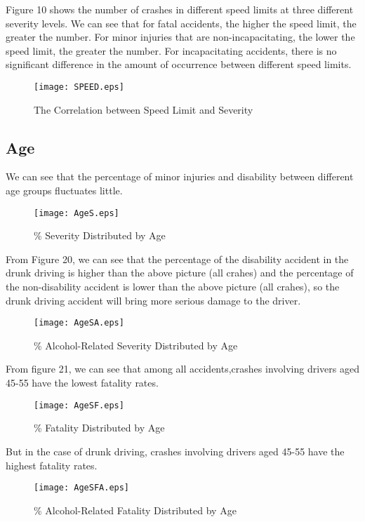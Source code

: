 \documentclass[10pt]{article}
\begin{document}
Figure 10 shows the number of crashes in different speed limits at three different severity levels. We can see that for fatal accidents, the higher the speed limit, the greater the number. For minor injuries that are non-incapacitating, the lower the speed limit, the greater the number. For incapacitating accidents, there is no significant difference in the amount of occurrence between different speed limits.

\begin{figure}[H]
\flushleft
\texttt{[image: SPEED.eps]}
\caption{The Correlation between Speed Limit and Severity}
\label{18}
\end{figure}

\newpage
\subsection{Age}

We can see that the percentage of minor injuries and disability between different age groups fluctuates little.

\begin{figure}[H]
\flushleft
\texttt{[image: AgeS.eps]}
\caption{\% Severity Distributed by Age}
\label{19}
\end{figure}

\newpage

From Figure 20, we can see that the percentage of the disability accident in the drunk driving is higher than the above picture (all crahes) and the percentage of the non-disability accident is lower than the above picture (all crahes), so the drunk driving accident will bring more serious damage to the driver.

\begin{figure}[H]
\flushleft
\texttt{[image: AgeSA.eps]}
\caption{\% Alcohol-Related Severity Distributed by Age}
\label{20}
\end{figure}

\newpage
From figure 21, we can see that among all accidents,crashes involving drivers aged 45-55 have the lowest fatality rates.

\begin{figure}[H]
\flushleft
\texttt{[image: AgeSF.eps]}
\caption{\% Fatality Distributed by Age}
\label{21}
\end{figure}

\newpage
But in the case of drunk driving, crashes involving drivers aged 45-55 have the highest fatality rates.

\begin{figure}[H]
\flushleft
\texttt{[image: AgeSFA.eps]}
\caption{\% Alcohol-Related Fatality Distributed by Age}
\label{22}
\end{figure}
\end{document}
